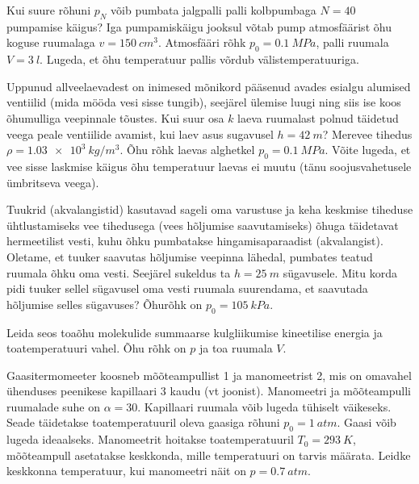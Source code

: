 \documentclass[10pt]{article}
\begin{document}
{
Kui suure rõhuni $p_N$ võib pumbata jalgpalli palli kolbpumbaga $N = 40$ pumpamise käigus? Iga pumpamiskäigu jooksul võtab pump atmosfäärist õhu koguse ruumalaga $v = \SI{150}{cm^3}$. Atmosfääri rõhk $p_0 = \SI{0,1}{MPa}$, palli ruumala $V = \SI{3}{l}$. Lugeda, et õhu temperatuur pallis võrdub välistemperatuuriga.
\probend
\bigskip


Uppunud allveelaevadest on inimesed mõnikord pääsenud avades esialgu alumised ventiilid (mida mööda vesi sisse tungib), seejärel ülemise luugi ning siis ise koos õhumulliga veepinnale tõustes. Kui suur osa $k$ laeva ruumalast polnud täidetud veega peale ventiilide avamist, kui laev asus sugavusel $h = \SI{42}{m}$? Merevee tihedus $\rho = \SI{1,03e3}{kg/m^3}$. Õhu rõhk laevas alghetkel $p_0 = \SI{0,1}{MPa}$. Võite lugeda, et vee sisse laskmise käigus õhu temperatuur laevas ei muutu (tänu soojusvahetusele ümbritseva veega).
\probend
\bigskip


Tuukrid (akvalangistid) kasutavad sageli oma varustuse ja keha keskmise tiheduse ühtlustamiseks vee tihedusega (vees hõljumise saavutamiseks) õhuga täidetavat hermeetilist vesti, kuhu õhku pumbatakse hingamisaparaadist (akvalangist). Oletame, et tuuker saavutas hõljumise veepinna lähedal, pumbates teatud ruumala õhku oma vesti. Seejärel sukeldus ta $h = \SI{25}{m}$ sügavusele. Mitu korda pidi tuuker sellel sügavusel oma vesti ruumala suurendama, et saavutada hõljumise selles sügavuses? Õhurõhk on $p_0 = \SI{105}{kPa}$.
\probend
\bigskip


Leida seos toaõhu molekulide summaarse kulgliikumise kineetilise energia ja toatemperatuuri vahel. Õhu rõhk on $p$ ja toa ruumala $V$.
\probend
\bigskip


Gaasitermomeeter koosneb mõõteampullist 1 ja manomeetrist 2, mis on omavahel ühenduses peenikese kapillaari 3 kaudu (vt joonist). Manomeetri ja mõõteampulli ruumalade suhe on $\alpha = 30$. Kapillaari ruumala võib lugeda tühiselt väikeseks. Seade täidetakse toatemperatuuril oleva gaasiga rõhuni $p_0 = \SI{1}{atm}$. Gaasi võib lugeda ideaalseks. Manomeetrit hoitakse toatemperatuuril $T_0 = \SI{293}{K}$, mõõteampull asetatakse keskkonda, mille temperatuuri on tarvis määrata. Leidke keskkonna temperatuur, kui manomeetri näit on $p = \SI{0,7}{atm}$.

}
\end{document}
